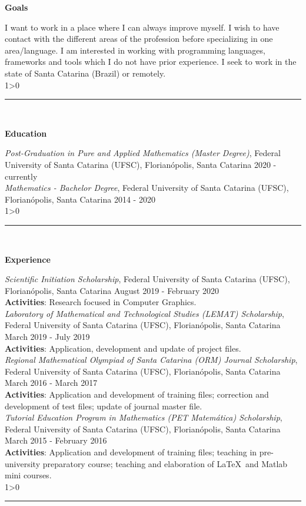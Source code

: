 \documentclass[a4paper,10pt]{article}
\newcommand{\createSection}[4][0]{
    \noindent
	\begin{minipage}{0.16\linewidth}
		\large{\textbf{#2}}
		\vspace{#3\baselineskip}
	\end{minipage}
	\hfill
	\begin{minipage}{0.79\linewidth}
		#4
		\ifnum0#1>0 { \hrule {\ } } \fi
	\end{minipage}
	\vspace{\baselineskip}
}
\begin{document}
	\vspace{\baselineskip}
	
	\createSection[1]{Goals}{3}{
	    I want to work in a place where I can always improve myself. I wish to have contact with the different areas of the profession before specializing in one area/language. I am interested in working with programming languages, frameworks and tools which I do not have prior experience. I seek to work in the state of Santa Catarina (Brazil) or  remotely. \\
	}
	
	\createSection[1]{Education}{4}{
	    \textit{Post-Graduation in Pure and Applied Mathematics (Master Degree)}, Federal University of Santa Catarina (UFSC), Florianópolis, Santa Catarina \hfill 2020 - currently \\
		
		\textit{Mathematics - Bachelor Degree}, Federal University of Santa Catarina (UFSC), Florianópolis, Santa Catarina \hfill 2014 - 2020 \\
	}
	
	\createSection[1]{Experience}{14}{
	    \textit{Scientific Initiation Scholarship}, Federal University of Santa Catarina (UFSC), Florianópolis, Santa Catarina \hfill August 2019 - February 2020 \\
		\textbf{Activities}: Research focused in Computer Graphics.\\
		
		
		\textit{Laboratory of Mathematical and Technological Studies (LEMAT) Scholarship}, Federal University of Santa Catarina (UFSC), Florianópolis, Santa Catarina \hfill March 2019 - July 2019 \\
		\textbf{Activities}: Application, development and update of project files.\\
		
		\textit{Regional Mathematical Olympiad of Santa Catarina (ORM) Journal Scholarship}, Federal University of Santa Catarina (UFSC), Florianópolis, Santa Catarina \hfill March 2016 - March 2017 \\
		\textbf{Activities}: Application and development of training files; correction and development of test files; update of journal master file.\\
		
		\textit{Tutorial Education Program in Mathematics (PET Matemática) Scholarship}, Federal University of Santa Catarina (UFSC), Florianópolis, Santa Catarina \hfill March 2015 - February 2016 \\
		\textbf{Activities}: Application and development of training files; teaching in pre-university preparatory course; teaching and elaboration of \LaTeX\ and Matlab mini courses.\\
	}
    
\end{document}
